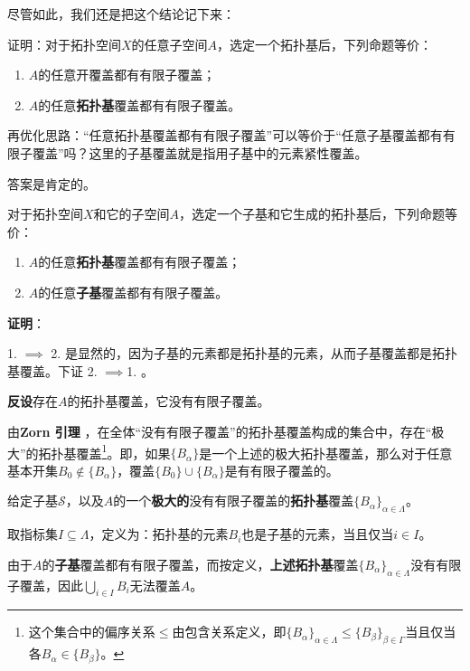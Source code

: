 尽管如此，我们还是把这个结论记下来：

\begin{exercise}{}\label{exe_TychT_1}
证明：对于拓扑空间$X$的任意子空间$A$，选定一个拓扑基后，下列命题等价：
\begin{enumerate}
\item $A$的任意开覆盖都有有限子覆盖；
\item $A$的任意\textbf{拓扑基}覆盖都有有限子覆盖。
\end{enumerate}
\end{exercise}

再优化思路：“任意拓扑基覆盖都有有限子覆盖”可以等价于“任意子基覆盖都有有限子覆盖”吗？这里的子基覆盖就是指用子基中的元素紧性覆盖。

答案是肯定的。

\begin{theorem}{}\label{the_TychT_1}
对于拓扑空间$X$和它的子空间$A$，选定一个子基和它生成的拓扑基后，下列命题等价：
\begin{enumerate}
\item $A$的任意\textbf{拓扑基}覆盖都有有限子覆盖；
\item $A$的任意\textbf{子基}覆盖都有有限子覆盖。
\end{enumerate}
\end{theorem}

\textbf{证明}：

1. $\implies$ 2. 是显然的，因为子基的元素都是拓扑基的元素，从而子基覆盖都是拓扑基覆盖。下证 2. $\implies$1. 。

\textbf{反设}存在$A$的拓扑基覆盖，它没有有限子覆盖。

由\textbf{Zorn 引理}%
，在全体“没有有限子覆盖”的拓扑基覆盖构成的集合中，存在“极大”的拓扑基覆盖\footnote{这个集合中的偏序关系$\leq$由包含关系定义，即$\{B_\alpha\}_{\alpha\in \Lambda}\leq\{B_\beta\}_{\beta\in \Gamma}$当且仅当各$B_\alpha\in\{B_\beta\}$。}。即，如果$\{B_\alpha\}$是一个上述的极大拓扑基覆盖，那么对于任意基本开集$B_0\not\in\{B_\alpha\}$，覆盖$\{B_0\}\cup\{B_\alpha\}$是有有限子覆盖的。

给定子基$\mathcal{S}$，以及$A$的一个\textbf{极大的}没有有限子覆盖的\textbf{拓扑基}覆盖$\{B_\alpha\}_{\alpha\in \Lambda}$。

取指标集$I\subseteq \Lambda$，定义为：拓扑基的元素$B_i$也是子基的元素，当且仅当$i\in I$。

由于$A$的\textbf{子基}覆盖都有有限子覆盖，而按定义，\textbf{上述拓扑基}覆盖$\{B_\alpha\}_{\alpha\in \Lambda}$没有有限子覆盖，因此$\bigcup_{i\in I} B_i$无法覆盖$A$。

